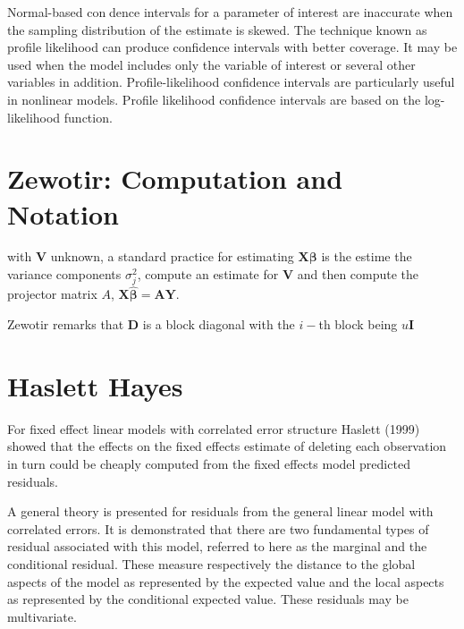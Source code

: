\documentclass[12pt, a4paper]{report}
\theoremstyle{plain}
\theoremstyle{definition}
\theoremstyle{remark}
\begin{document}
	
	Normal-based condence intervals for a parameter of interest are inaccurate when the sampling 
	distribution of the estimate is skewed. The technique known as profile likelihood can produce confidence 
	intervals with better coverage. It may be used when the model includes only the variable of interest or 
	several other variables in addition.
	Profile-likelihood confidence intervals are particularly useful in nonlinear models. 
	Profile likelihood confidence intervals are based on the log-likelihood function.
	
	
	
	
	
	



	\section{Zewotir: Computation and Notation } %
	with $\boldsymbol{V}$ unknown, a standard practice for estimating $\boldsymbol{X \beta}$ is the estime the variance components $\sigma^2_j$,
	compute an estimate for $\boldsymbol{V}$ and then compute the projector matrix $A$, $\boldsymbol{X \hat{\beta}}  = \boldsymbol{AY}$.
	
	
	Zewotir remarks that $\boldsymbol{D}$ is a block diagonal with the $i-$th block being $u \boldsymbol{I}$
	\section{Haslett Hayes}                %
	
	For fixed effect linear models with correlated error structure
	Haslett (1999) showed that the effects on the fixed effects
	estimate of deleting each observation in turn could be cheaply
	computed from the fixed effects model predicted residuals.
	
	
	A general theory is presented for residuals from the general
	linear model with correlated errors. It is demonstrated that there
	are two fundamental types of residual associated with this model,
	referred to here as the marginal and the conditional residual.
	These measure respectively the distance to the global aspects of
	the model as represented by the expected value and the local
	aspects as represented by the conditional expected value. These
	residuals may be multivariate.
	
\end{document}
